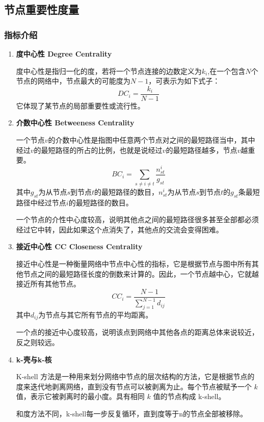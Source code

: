 \documentclass[12pt]{xjtureport}
\begin{document}
\subsection{节点重要性度量}

\subsubsection{指标介绍}
\begin{enumerate}

    \item \textbf{度中心性 Degree Centrality}
    
    度中心性是指归一化的度，若将一个节点连接的边数定义为$k_i$,在一个包含$N$个节点的网络中，节点最大的可能度为$N-1$，可表示为如下式子：
    $$DC_i = \frac{k_i}{N-1}$$
    它体现了某节点的局部重要性或流行性。

    \item \textbf{ 介数中心性 Betweeness Centrality}
    
    一个节点$v$的介数中心性是指图中任意两个节点对之间的最短路径当中，其中经过$v$的最短路径的所占的比例，也就是说经过$v$的最短路径越多，节点$v$越重要。
    $$BC_i = \sum_{s\neq i\neq t}\frac{n^i_{st}}{g_{st}}$$
    其中$g_{st}$为从节点$s$到节点$t$的最短路径的数目，$n^i_{st}$为从节点$s$到节点$t$的$g_{st}$条最短路径中经过节点$i$的最短路径的数目。
    
    一个节点的介性中心度较高，说明其他点之间的最短路径很多甚至全部都必须经过它中转，因此如果这个点消失了，其他点的交流会变得困难。
    
    \item \textbf{接近中心性 CC Closeness Centrality}
    
    接近中心性是一种衡量网络中节点中心性的指标，它是根据节点与图中所有其他节点之间的最短路径长度的倒数来计算的。因此，一个节点越中心，它就越接近所有其他节点。
    $$CC_i = \frac{N-1}{\sum^{N-1}_{j=1}d_{ij}}$$
    其中$d_{ij}$为节点与其它所有节点的平均距离。

    一个点的接近中心度较高，说明该点到网络中其他各点的距离总体来说较近，反之则较远。

    \item \textbf{k-壳与k-核}
    
    K-shell 方法是一种用来划分网络中节点的层次结构的方法，它是根据节点的度来迭代地剥离网络，直到没有节点可以被剥离为止。每个节点被赋予一个 $k$ 值，表示它被剥离时的最小度。具有相同 $k$ 值的节点构成 k-shell。
    
    和度方法不同，k-shell每一步反复循环，直到度等于n的节点全部被移除。
    

\end{enumerate}
\end{document}
